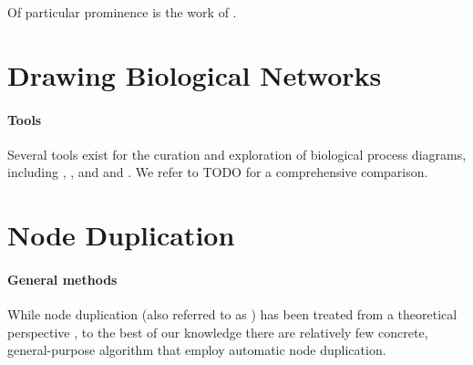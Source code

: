 \documentclass[
	fontsize=10pt, %
	twoside=false, %
	secnumdepth=1, %
]{kaobook}
\begin{document}

Of particular prominence is the work of
\citeauthor{nielsen_MachineLearningSupport_2019}   
\cite{nielsen_MachineLearningSupport_2019}. 

\section{Drawing Biological Networks}





\paragraph{Tools} Several tools exist for the curation and exploration of
biological process diagrams, including 
\cite{funahashi_CellDesignerVersatileModeling_2008}, 
\cite{gawron_MINERVAPlatformVisualization_2016}, and 
\cite{shannon_cytoscape_2003} and 
\cite{rohn_VANTEDV2Framework_2012}. We refer to TODO for a comprehensive
comparison.




\section{Node Duplication}

\paragraph{General methods} While node duplication (also referred to as
) has been treated from a theoretical perspective
\cite{liebers_PlanarizingGraphsSurvey_2001}
\cite{abu-khzam_ClusterEditingVertex_2018},
to the best of our knowledge there are relatively few concrete, general-purpose
algorithm that employ automatic node duplication.
\end{document}
